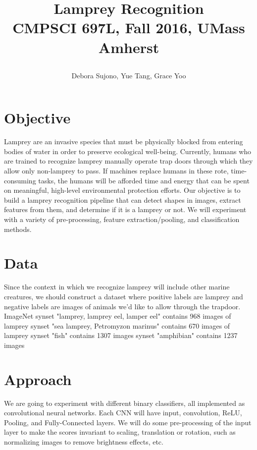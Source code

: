 \documentclass[10pt,letterpaper]{article}
\title{
  \textbf{Lamprey Recognition} \\
  \Large{CMPSCI 697L, Fall 2016, UMass Amherst} \\
  \author{Debora Sujono, Yue Tang, Grace Yoo}
}
\date{}
\begin{document}
\maketitle

\section{Objective}
Lamprey are an invasive species that must be physically blocked from entering bodies of water in order to preserve ecological well-being. Currently, humans who are trained to recognize lamprey manually operate trap doors through which they allow only non-lamprey to pass. If machines replace humans in these rote, time-consuming tasks, the humans will be afforded time and energy that can be spent on meaningful, high-level environmental protection efforts. Our objective is to build a lamprey recognition pipeline that can detect shapes in images, extract features from them, and determine if it is a lamprey or not. We will experiment with a variety of pre-processing, feature extraction/pooling, and classification methods.

\section{Data}
Since the context in which we recognize lamprey will include other marine creatures, we should construct a dataset where positive labels are lamprey and negative labels are images of animals we'd like to allow through the trapdoor.\\

\noindent ImageNet \cite{imagenet}
\subitem synset "lamprey, lamprey eel, lamper eel" contains 968 images of lamprey
\subitem synset "sea lamprey, Petromyzon marinus" contains 670 images of lamprey
\subitem synset "fish" contains 1307 images
\subitem synset "amphibian" contains 1237 images


\section{Approach}
We are going to experiment with different binary classifiers, all implemented as convolutional neural networks. Each CNN will have input, convolution, ReLU, Pooling, and Fully-Connected layers. We will do some pre-processing of the input layer to make the scores invariant to scaling, translation or rotation, such as normalizing images to remove brightness effects, etc. 
 
\end{document}
